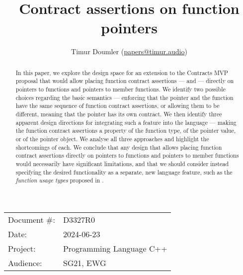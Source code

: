 

 \usepackage[bottom]{footmisc} 

 \usepackage{longtable}


\usepackage{tikz,lipsum,lmodern}
\usepackage[most]{tcolorbox}



\usepackage{titlesec}
\usepackage{tocloft}


\newcommand{\changelocaltocdepth}[1]{%
  \addtocontents{toc}{\protect\setcounter{tocdepth}{#1}}%
  \setcounter{tocdepth}{#1}%
}

\setcounter{tocdepth}{3}



\title{Contract assertions on function pointers}
\author{ Timur Doumler \small(\href{mailto:papers@timur.audio}{papers@timur.audio}) 
}
\date{}
\maketitle

\begin{tabular}{ll}
Document \#: & D3327R0 \\
Date: &2024-06-23 \\
Project: & Programming Language C++ \\
Audience: & SG21, EWG
\end{tabular}

\begin{abstract}
In this paper, we explore the design space for an extension to the Contracts MVP proposal \cite{P2900R7} that would allow placing function contract assertions ---  and  --- directly on pointers to functions and pointers to member functions. We identify two possible choices regarding the basic semantics --- enforcing that the pointer and the function have the same sequence of function contract assertions, or allowing them to be different, meaning that the pointer has its own contract. We then identify three apparent design directions for integrating such a feature into the language --- making the function contract assertions a property of the function type, of the pointer value, or of the pointer object. We analyse all three approaches and highlight the shortcomings of each. We conclude that any design that allows placing function contract assertions directly on pointers to functions and pointers to member functions would necessarily have significant limitations, and that we should consider instead specifying the desired functionality as a separate, new language feature, such as the \emph{function usage types} proposed in \cite{P3271R0}.
\end{abstract}


